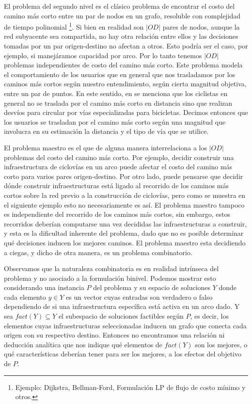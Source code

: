 \documentclass{article}
\begin{document}
  El problema del segundo nivel es el clásico problema de encontrar el costo del camino más corto entre un par de nodos en un grafo, resoluble con complejidad de tiempo polinomial \footnote{Ejemplo: Dijkstra, Bellman-Ford, Formulación LP de flujo de costo mínimo y otros.}. Si bien en realidad son $|OD|$ pares de nodos, aunque la red subyacente sea compartida, no hay otra relación entre ellos y las decisiones tomadas por un par origen-destino no afectan a otros. Esto podría ser el caso, por ejemplo, si manejáramos capacidad por arco. Por lo tanto tenemos $|OD|$ problemas independientes de costo del camino más corto. Este problema modela el comportamiento de los usuarios que en general que nos trasladamos por los caminos más cortos según nuestro entendimiento, según cierta magnitud objetiva, entre un par de puntos. En este sentido, en \cite{liu2019} se menciona que los ciclistas en general no se traslada por el camino más corto en distancia sino que realizan desvíos para circular por vías especializadas para bicicletas. Decimos entonces que los usuarios se trasladan por el camino más corto según una magnitud que involucra en su estimación la distancia y el tipo de vía que se utilice.

  El problema maestro es el que de alguna manera interrelaciona a los $|OD|$ problemas del costo del camino más corto. Por ejemplo, decidir construir una infraestructura de ciclovías en un arco puede afectar el costo del camino más corto para varios pares origen-destino. Por otro lado, puede pensarse que decidir dónde construir infraestructuras está ligado al recorrido de los caminos más cortos sobre la red previo a la construcción de ciclovías, pero como se muestra en el siguiente ejemplo esto no necesariamente es así. El problema maestro tampoco es independiente del recorrido de los caminos más cortos, sin embargo, estos recorridos deberían computarse una vez decididas las infraestructuras a construir, y esta es la dificultad inherente del problema, dado que no es posible determinar qué decisiones inducen los mejores caminos. El problema maestro esta decidiendo a ciegas, y dicho de otra manera, es un problema combinatorio.

  Observamos que la naturaleza combinatoria es en realidad intrínseca del problema y no asociado a la formulación binivel. Podemos mostrar esto considerando una instancia $P$ del problema y su espacio de soluciones $Y$ donde cada elemento $y \in Y$ es un vector cuyas entradas son verdadero o falso dependiendo de si una infraestructura específica está activa en un arco dado. Y sea $fact(Y) \subseteq Y$ el subespacio de soluciones factibles según $P$, es decir, los elementos cuyas infraestructuras seleccionadas inducen un grafo que conecta cada origen con su respectivo destino. Entonces no encontramos una relación ni deducción analítica que nos indique qué elementos de $fact(Y)$ son los mejores, o qué características deberían tener para ser los mejores, a los efectos del objetivo de $P$.
\end{document}
